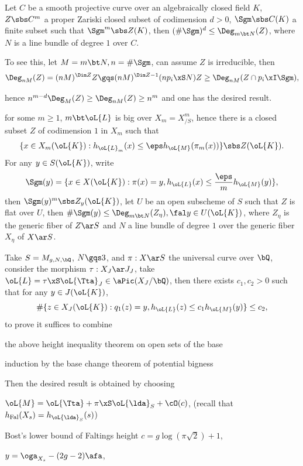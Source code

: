\documentclass[a4paper, twoside]{article}
\begin{document}
\begin{prf}
	 Let $C$ be a smooth projective curve over an algebraically closed field $K$, $Z\sbs C^{m}$ a proper Zariski closed subset of codimension $d>0$, $\Sgm\sbs C(K)$ a finite subset such that $\Sgm^{m}\sbs Z(K)$, then $(\#\Sgm)^{d}\leq\Deg_{m\bt N}(Z)$, where $N$ is a line bundle of degree $1$ over $C$.

	To see this, let $M=m\bt N, n=\#\Sgm$, can assume $Z$ is irreducible, then
	\[
		\Deg_{nM}(Z)=(nM)^{\Dim Z}Z\gqs(nM)^{\Dim Z-1}(np_{i}\xS N)Z\geq\Deg_{nM}(Z\cap p_{i}\xI\Sgm),
	\]

	hence $n^{m-d}\Deg_{M}(Z)\geq\Deg_{nM}(Z)\geq n^{m}$ and one has the desired result.

	 for some $m\geq1$, $m\bt\oL{L}$ is big over $X_{m}=X_{/S}^{m}$, hence there is a closed subset $Z$ of codimension $1$ in $X_{m}$ such that
	\[
		\{x\in X_{m}(\oL{K}):h_{\oL{L}_{m}}(x)\leq\eps h_{\oL{M}}(\pi_{m}(x))\}\sbs Z(\oL{K}).
	\]
	For any $y\in S(\oL{K})$, write
	\[
		\Sgm(y)=\{x\in X(\oL{K}):\pi(x)=y,h_{\oL{L}}(x)\leq\frac{\eps}{m}h_{\oL{M}}(y)\},
	\]
	then $\Sgm(y)^{m}\sbs Z_{y}(\oL{K})$, let $U$ be an open subscheme of $S$ such that $Z$ is flat over $U$, then $\#\Sgm(y)\leq\Deg_{m\bt N}(Z_{\eta}),\fal y\in U(\oL{K})$, where $Z_{\eta}$ is the generic fiber of $Z\ar S$ and $N$ a line bundle of degree $1$ over the generic fiber $X_{\eta}$ of $X\ar S$.
\end{prf}


Take $S=M_{g,N,\bQ}$, $N\gqs3$, and $\pi:X\ar S$ the universal curve over $\bQ$, consider the morphism $\tau:X_{J}\ar J_{J}$, take $\oL{L}=\tau\xS\oL{\Tta}_{J}\in\aPic(X_{J}/\bQ)$, then there exists $c_{1},c_{2}>0$ such that for any $y\in J(\oL{K})$,
\[
	\#\{z\in X_{J}(\oL{K}):q_{1}(z)=y, h_{\oL{L}}(z)\leq c_{1}h_{\oL{M}}(y)\}\leq c_{2},
\]
to prove it suffices to combine
\begin{enr}
	\item the above height inequality theorem on open sets of the base
	\item induction by the base change theorem of potential bigness
\end{enr}
Then the desired result is obtained by choosing
\begin{enr}
	\item $\oL{M}=\oL{\Tta}+\pi\xS\oL{\lda}_{S}+\cO(c)$, (recall that $h_{\mathrm{Fal}}(X_{s})=h_{\oL{\lda}_{S}}(s)$)
	\item Bost's lower bound of Faltings height $c=g\log(\pi\sqrt{2})+1$,
	\item $y=\oga_{X_{s}}-(2g-2)\afa$,
\end{enr}
\end{document}
